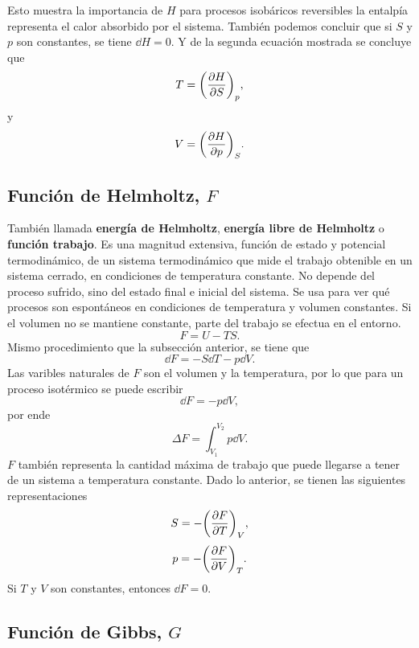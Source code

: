 Esto muestra la importancia de $H$ para procesos isobáricos reversibles la entalpía representa el calor absorbido por el sistema. También podemos concluir que si $S$ y $p$ son constantes, se tiene $\dd{H} = 0$. Y de la segunda ecuación mostrada se concluye que
	$$ T = \qty(\pdv{H}{S})_p, $$
y
	$$ V = \qty(\pdv{H}{p})_S. $$


\subsection{Función de Helmholtz, $F$}
También llamada \textbf{energía de Helmholtz}, \textbf{energía libre de Helmholtz} o \textbf{función trabajo}. Es una magnitud extensiva, función de estado y potencial termodinámico, de un sistema termodinámico que mide el trabajo obtenible en un sistema cerrado, en condiciones de temperatura constante. No depende del proceso sufrido, sino del estado final e inicial del sistema. Se usa para ver qué procesos son espontáneos en condiciones de temperatura y volumen constantes. Si el volumen no se mantiene constante, parte del trabajo se efectua en el entorno.
	$$ F = U - TS. $$
Mismo procedimiento que la subsección anterior, se tiene que
	$$ \dd{F} = -S\dd{T} - p\dd{V}. $$
Las varibles naturales de $F$ son el volumen y la temperatura, por lo que para un proceso isotérmico se puede escribir
	$$ \dd{F} = -p\dd{V}, $$
por ende
	$$ \Delta F = \int _{V_1} ^{V_2} p\dd{V}. $$
$F$ también representa la cantidad máxima de trabajo que puede llegarse a tener de un sistema a temperatura constante. Dado lo anterior, se tienen las siguientes representaciones
	$$ S = -\qty(\pdv{F}{T})_V, $$
	$$ p = -\qty(\pdv{F}{V})_T. $$
Si $T$ y $V$ son constantes, entonces $\dd{F} = 0$.


\subsection{Función de Gibbs, $G$}



























































